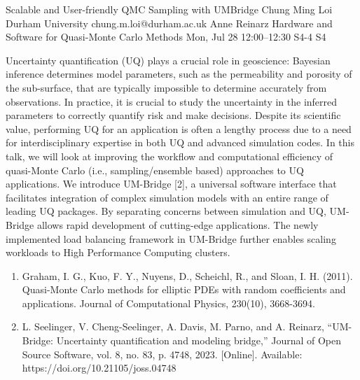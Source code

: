 \documentclass[12pt,lettersize,oneside]{book} %
\begin{document}
\begin{talk}
  {Scalable and User-friendly QMC Sampling with UMBridge}%
  {Chung Ming Loi}%
  {Durham University}%
  {chung.m.loi@durham.ac.uk}%
  {Anne Reinarz}%
  {Hardware and Software for Quasi-Monte Carlo Methods}%
  {Mon, Jul 28 12:00--12:30}%
  {S4-4}%
  {S4}%
    
   
Uncertainty quantification (UQ) plays a crucial role in geoscience: Bayesian inference determines model parameters, such as the permeability and porosity of the sub-surface, that are typically impossible to determine accurately from observations. In practice, it is crucial to study the uncertainty in the inferred parameters to correctly quantify risk and make decisions. Despite its scientific value, performing UQ for an application is often a lengthy process due to a need for interdisciplinary expertise in both UQ and advanced simulation codes. In this talk, we will look at improving the workflow and computational efficiency of quasi-Monte Carlo (i.e., sampling/ensemble based) approaches to UQ applications. We introduce UM-Bridge [2], a universal software interface that facilitates integration of complex simulation models with an entire range of leading UQ packages. By separating concerns between simulation and UQ, UM-Bridge allows rapid development of cutting-edge applications. The newly implemented load balancing framework in UM-Bridge further enables scaling workloads to High Performance Computing clusters.

\begin{enumerate}
    \item[{[1]}] Graham, I. G., Kuo, F. Y., Nuyens, D., Scheichl, R., and Sloan, I. H. (2011). Quasi-Monte Carlo methods for elliptic PDEs with random coefficients and applications. Journal of Computational Physics, 230(10), 3668-3694.
    \item[{[2]}]  L. Seelinger, V. Cheng-Seelinger, A. Davis, M. Parno, and A. Reinarz, “UM-Bridge: Uncertainty quantification and modeling bridge,” Journal of Open Source Software, vol. 8, no. 83, p. 4748, 2023. [Online]. Available: https://doi.org/10.21105/joss.04748
\end{enumerate}

\end{talk}
\end{document}

